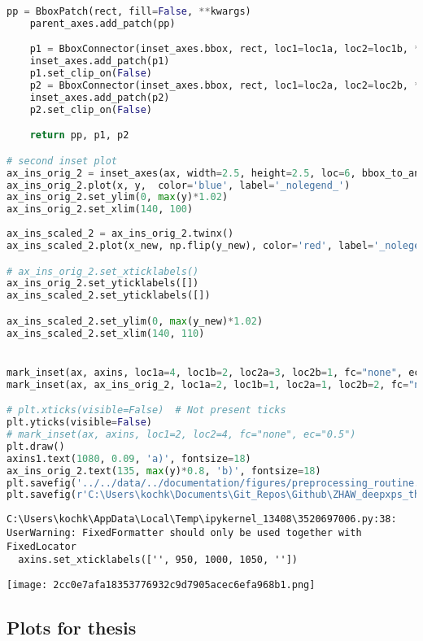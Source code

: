 \begin{lstlisting}[language=Python]
    pp = BboxPatch(rect, fill=False, **kwargs)
    parent_axes.add_patch(pp)

    p1 = BboxConnector(inset_axes.bbox, rect, loc1=loc1a, loc2=loc1b, **kwargs)
    inset_axes.add_patch(p1)
    p1.set_clip_on(False)
    p2 = BboxConnector(inset_axes.bbox, rect, loc1=loc2a, loc2=loc2b, **kwargs)
    inset_axes.add_patch(p2)
    p2.set_clip_on(False)

    return pp, p1, p2

# second inset plot
ax_ins_orig_2 = inset_axes(ax, width=2.5, height=2.5, loc=6, bbox_to_anchor=(1300, 900))
ax_ins_orig_2.plot(x, y,  color='blue', label='_nolegend_')
ax_ins_orig_2.set_ylim(0, max(y)*1.02)
ax_ins_orig_2.set_xlim(140, 100)
 
ax_ins_scaled_2 = ax_ins_orig_2.twinx()
ax_ins_scaled_2.plot(x_new, np.flip(y_new), color='red', label='_nolegend_')

# ax_ins_orig_2.set_xticklabels()
ax_ins_orig_2.set_yticklabels([])
ax_ins_scaled_2.set_yticklabels([])

ax_ins_scaled_2.set_ylim(0, max(y_new)*1.02)
ax_ins_scaled_2.set_xlim(140, 110)


mark_inset(ax, axins, loc1a=4, loc1b=2, loc2a=3, loc2b=1, fc="none", ec="black") 
mark_inset(ax, ax_ins_orig_2, loc1a=2, loc1b=1, loc2a=1, loc2b=2, fc="none", ec="black") 

# plt.xticks(visible=False)  # Not present ticks
plt.yticks(visible=False)
# mark_inset(ax, axins, loc1=2, loc2=4, fc="none", ec="0.5")
plt.draw()
axins1.text(1080, 0.09, 'a)', fontsize=18)
ax_ins_orig_2.text(135, max(y)*0.8, 'b)', fontsize=18)
plt.savefig('../../data/../documentation/figures/preprocessing_routine.png')
plt.savefig(r'C:\Users\kochk\Documents\Git_Repos\Github\ZHAW_deepxps_thesis\Figures\preprocessing_routine.png')
\end{lstlisting}

\begin{lstlisting}
C:\Users\kochk\AppData\Local\Temp\ipykernel_13408\3520697006.py:38: UserWarning: FixedFormatter should only be used together with FixedLocator
  axins.set_xticklabels(['', 950, 1000, 1050, ''])
\end{lstlisting}

\texttt{[image: 2cc0e7afa18353776932c9d7905acec6efa968b1.png]}

\hypertarget{plots-for-thesis}{%
\subsection{Plots for thesis}\label{plots-for-thesis}}


